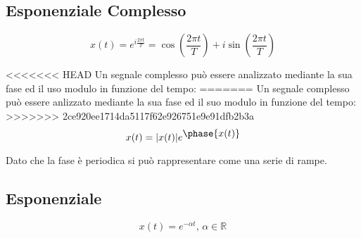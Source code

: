 \documentclass{article}
\numberwithin{equation}{subsection}
\begin{document}
\subsection{Esponenziale Complesso}

\begin{equation}
    x(t)=\displaystyle e^{i\frac{2\pi t}{T}}=\cos\left(\frac{2\pi t}{T}\right)+i\sin\left(\frac{2\pi t}{T}\right)
\end{equation}

<<<<<<< HEAD
Un segnale complesso può essere analizzato mediante la sua fase ed il uso modulo in funzione del tempo:
=======
Un segnale complesso può essere anlizzato mediante la sua fase ed il suo modulo in funzione del tempo:
>>>>>>> 2ce920ee1714da5117f62e926751e9e91dfb2b3a
\begin{equation*}
    x(t)=|x(t)|e^{\displaystyle\phase{x(t)}}
\end{equation*}

Dato che la fase è periodica si può rappresentare come una serie di rampe.

\begin{center}
\end{center}

\subsection{Esponenziale}

\begin{equation}
    x(t)=e^{-\alpha t},\,\alpha\in\mathbb{R}
\end{equation}
\end{document}
